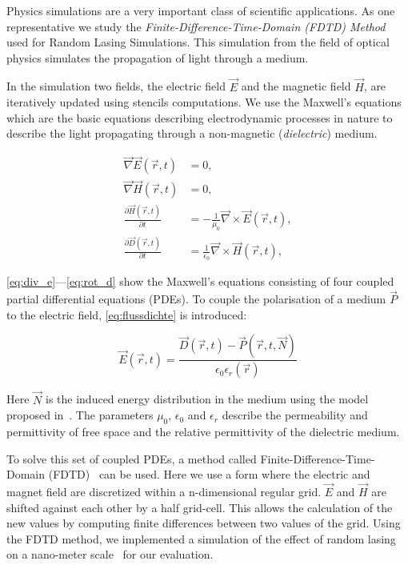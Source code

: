Physics simulations are a very important class of scientific applications.
As one representative we study the \emph{Finite-Difference-Time-Domain (FDTD) Method} used for Random Lasing Simulations.
This simulation from the field of optical physics simulates the propagation of light through a medium.

In the simulation two fields, the electric field $\vec{E}$ and the magnetic field $\vec{H}$, are iteratively updated using stencils computations.
We use the Maxwell's equations which are the basic equations describing electrodynamic processes in nature to describe the light propagating through a non-magnetic (\emph{dielectric}) medium.

\begin{align}
  \vec{\nabla}\vec{E}\left(\vec{r}, t\right) &= 0, \label{eq:div_e}\\
  \vec{\nabla}\vec{H}\left(\vec{r}, t\right) &= 0, \label{eq:div_h}\\
  \frac{\partial\vec{H}\left(\vec{r}, t\right)}{\partial t} &= -\frac{1}{\mu_0}\vec{\nabla} \times \vec{E}\left(\vec{r}, t\right), \label{eq:rot_h}\\
  \frac{\partial\vec{D}\left(\vec{r}, t\right)}{\partial t} &= \frac{1}{\epsilon_0}\vec{\nabla} \times \vec{H}\left(\vec{r}, t\right), \label{eq:rot_d}
\end{align}

\noindent
\autoref{eq:div_e}---\ref{eq:rot_d} show the Maxwell's equations consisting of four coupled partial differential equations (PDEs).
To couple the polarisation of a medium $\vec{P}$ to the electric field, \autoref{eq:flussdichte} is introduced:

\begin{equation}
\vec{E}\left(\vec{r}, t\right) = \frac{\vec{D}\left(\vec{r}, t\right) - \vec{P}\left(\vec{r}, t, \vec{N}\right)}{\epsilon_0\epsilon_r\left(\vec{r}\right)}
\label{eq:flussdichte}
\end{equation}

\noindent
Here $\vec{N}$ is the induced energy distribution in the medium using the model proposed in~\cite{Jiang2000}.
The parameters $\mu_0$, $\epsilon_0$ and $\epsilon_r$ describe the permeability and permittivity of free space and the relative permittivity of the dielectric medium.

To solve this set of coupled PDEs, a method called Finite-Difference-Time-Domain (FDTD)~\cite{Yee1966} can be used.
Here we use a form where the electric and magnet field are discretized within a n-dimensional regular grid.
$\vec{E}$ and $\vec{H}$ are shifted against each other by a half grid-cell.
This allows the calculation of the new values by computing finite differences between two values of the grid.
Using the FDTD method, we implemented a simulation of the effect of random lasing on a nano-meter scale~\cite{Cao1999} for our evaluation.

